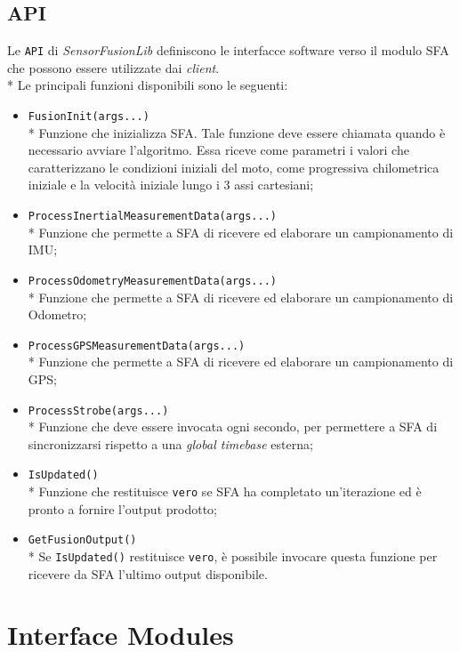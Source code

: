 \subsection{API}
Le \texttt{API} di \emph{SensorFusionLib} definiscono le interfacce software verso il modulo SFA che possono essere utilizzate dai \emph{client}.\\*
Le principali funzioni disponibili sono le seguenti:
\begin{itemize}
	\item \texttt{FusionInit(args...)}\\*
	Funzione che inizializza SFA. Tale funzione deve essere chiamata quando \`e necessario avviare l'algoritmo. Essa riceve come parametri i valori che caratterizzano le condizioni iniziali del moto, come progressiva chilometrica iniziale e la velocit\`a iniziale lungo i 3 assi cartesiani;
	\item \texttt{ProcessInertialMeasurementData(args...)}\\*
	Funzione che permette a SFA di ricevere ed elaborare un campionamento di IMU; 
	\item \texttt{ProcessOdometryMeasurementData(args...)}\\*
	Funzione che permette a SFA di ricevere ed elaborare un campionamento di Odometro;
	\item \texttt{ProcessGPSMeasurementData(args...)}\\*
	Funzione che permette a SFA di ricevere ed elaborare un campionamento di GPS;
	\item \texttt{ProcessStrobe(args...)}\\*
	Funzione che deve essere invocata ogni secondo, per permettere a SFA di sincronizzarsi rispetto a una \emph{global timebase} esterna; \cite{clock}
	\item 
	\texttt{IsUpdated()}\\*
	Funzione che restituisce \texttt{vero} se SFA ha completato un'iterazione ed \`e pronto a fornire l'output prodotto;
	\item \texttt{GetFusionOutput()}\\*
	Se \texttt{IsUpdated()} restituisce \texttt{vero}, \`e possibile invocare questa funzione per ricevere da SFA l'ultimo output disponibile.
\end{itemize}
\section{Interface Modules}
